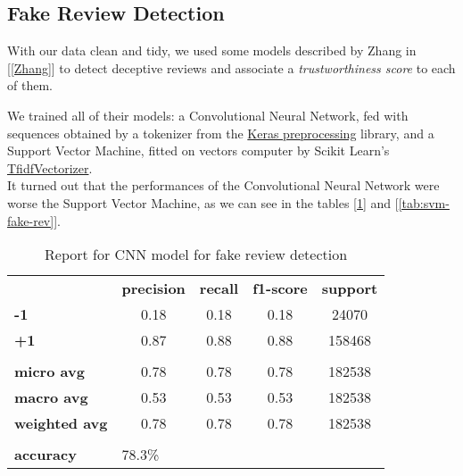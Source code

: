\subsection{Fake Review Detection} \label{sec:fake-rev}

With our data clean and tidy, we used some models described by Zhang in [\ref{Zhang}] to detect deceptive reviews and associate a \textit{trustworthiness score} to each of them.

We trained all of their models: a Convolutional Neural Network, fed with sequences obtained by a tokenizer from the \href{https://keras.io/preprocessing/text/}{Keras preprocessing} library, and a Support Vector Machine, fitted on vectors computer by Scikit Learn's \href{https://scikit-learn.org/stable/modules/generated/sklearn.feature_extraction.text.TfidfVectorizer.html}{TfidfVectorizer}.\\
It turned out that the performances of the Convolutional Neural Network were worse \wrt the Support Vector Machine, as we can see in the tables [\ref{tab:cnn-fake-rev}] and [\ref{tab:svm-fake-rev}].

\begin{table}[h!]
	\centering
	\begin{tabular}{lcccc}
		\rowcolor[HTML]{EEEEEE} 
		\cellcolor[HTML]{FBFBFB} & \textbf{precision} & \textbf{recall} & \textbf{f1-score} & \textbf{support} \\
		\rowcolor[HTML]{EEEEEE} 
		\textbf{-1}              & 0.18               & 0.18            & 0.18              & 24070            \\
		\rowcolor[HTML]{EEEEEE} 
		\textbf{+1}              & 0.87               & 0.88            & 0.88              & 158468           \\
		\rowcolor[HTML]{FBFBFB} 
		&                    &                 &                   &                  \\
		\rowcolor[HTML]{EEEEEE} 
		\textbf{micro avg}       & 0.78               & 0.78            & 0.78              & 182538           \\
		\rowcolor[HTML]{EEEEEE} 
		\textbf{macro avg}       & 0.53               & 0.53            & 0.53              & 182538           \\
		\rowcolor[HTML]{EEEEEE} 
		\textbf{weighted avg}    & 0.78               & 0.78            & 0.78              & 182538           \\
		\rowcolor[HTML]{FBFBFB} 
		&                    &                 &                   &                  \\
		\rowcolor[HTML]{EEEEEE} 
		\textbf{accuracy}        & \multicolumn{4}{l}{\cellcolor[HTML]{EEEEEE}78.3\%}                         
	\end{tabular}
	\caption{Report for CNN model for fake review detection}
	\label{tab:cnn-fake-rev}
\end{table}

